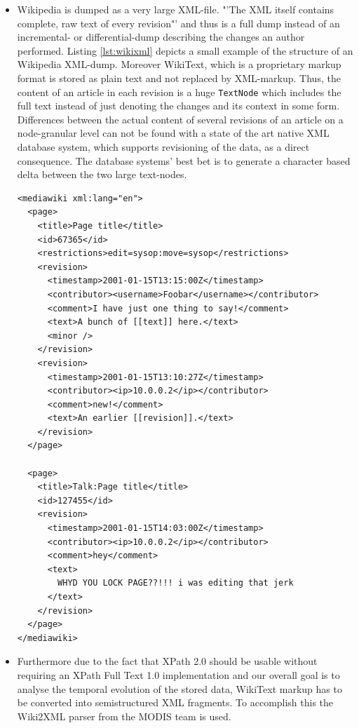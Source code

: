 \begin{itemize}
\item Wikipedia is dumped as a very large XML-file. "'The XML itself contains complete, raw text of every revision"' \cite{WikiDump} and thus is a full dump instead of an incremental- or differential-dump describing the changes an author performed. Listing \ref{lst:wikixml} depicts a small example of the structure of an Wikipedia XML-dump. Moreover WikiText, which is a proprietary markup format is stored as plain text and not replaced by XML-markup. Thus, the content of an article in each revision is a huge \texttt{TextNode} which includes the full text instead of just denoting the changes and its context in some form. Differences between the actual content of several revisions of an article on a node-granular level can not be found with a state of the art native XML database system, which supports revisioning of the data, as a direct consequence. The database systems' best bet is to generate a character based delta between the two large text-nodes.

\begin{lstlisting}[caption=Wikipedia Dump - XML representation]
<mediawiki xml:lang="en">
  <page>
    <title>Page title</title>
    <id>67365</id>
    <restrictions>edit=sysop:move=sysop</restrictions>
    <revision>
      <timestamp>2001-01-15T13:15:00Z</timestamp>
      <contributor><username>Foobar</username></contributor>
      <comment>I have just one thing to say!</comment>
      <text>A bunch of [[text]] here.</text>
      <minor />
    </revision>
    <revision>
      <timestamp>2001-01-15T13:10:27Z</timestamp>
      <contributor><ip>10.0.0.2</ip></contributor>
      <comment>new!</comment>
      <text>An earlier [[revision]].</text>
    </revision>
  </page>
    
  <page>
    <title>Talk:Page title</title>
    <id>127455</id>
    <revision>
      <timestamp>2001-01-15T14:03:00Z</timestamp>
      <contributor><ip>10.0.0.2</ip></contributor>
      <comment>hey</comment>
      <text>
        WHYD YOU LOCK PAGE??!!! i was editing that jerk
      </text>
    </revision>
  </page>
</mediawiki>
\end{lstlisting}
\label{lst:wikixml}

\item Furthermore due to the fact that XPath 2.0 should be usable without requiring an XPath Full Text 1.0 implementation and our overall goal is to analyse the temporal evolution of the stored data, WikiText markup has to be converted into semistructured XML fragments. To accomplish this the Wiki2XML parser from the MODIS team \cite{Wiki2XML} is used.


\end{itemize}
